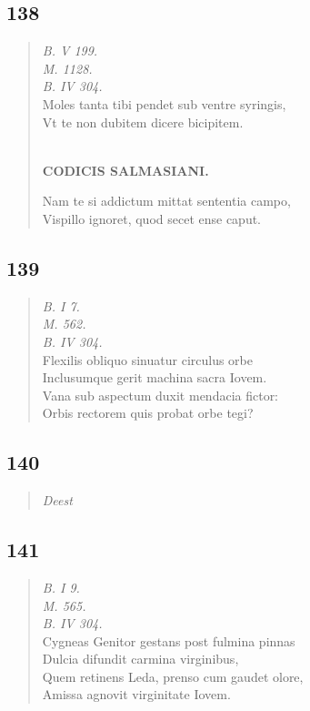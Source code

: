 \documentclass[11pt, a4paper]{report}
\begin{document}
            \subsection*{138}
      \begin{verse}
      \textit{B. V 199.} \\ \textit{M. 1128.} \\ \textit{B. IV 304.} \\ Moles tanta tibi pendet sub ventre syringis, \\ Vt te non dubitem dicere bicipitem. \\ 
        ﻿\pagebreak 
     \marginpar{[141]} \begin{center} \textbf{CODICIS SALMASIANI.} \end{center}Nam te si addictum mittat sententia campo, \\ Vispillo ignoret, quod secet ense caput. \\ 
      \end{verse}
  
            \subsection*{139}
      \begin{verse}
      \textit{B. I 7.} \\ \textit{M. 562.} \\ \textit{B. IV 304.} \\ Flexilis obliquo sinuatur circulus orbe \\ Inclusumque gerit machina sacra Iovem. \\ Vana sub aspectum duxit mendacia fictor: \\ Orbis rectorem quis probat orbe tegi? \\ 
      \end{verse}
  
            \subsection*{140}
      \begin{verse}
      \textit{Deest} \\ 
      \end{verse}
  
            \subsection*{141}
      \begin{verse}
      \textit{B. I 9.} \\ \textit{M. 565.} \\ \textit{B. IV 304.} \\ Cygneas Genitor gestans post fulmina pinnas \\ Dulcia difundit carmina virginibus, \\ Quem retinens Leda, prenso cum gaudet olore, \\ Amissa agnovit virginitate Iovem. \\ 
      \end{verse}
  
\end{document}
